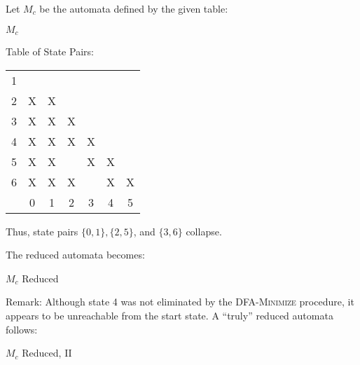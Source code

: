 Let $M_c$ be the automata defined by the given table:
\begin{automata}{$M_c$}
	
	
	
	
	
	
	
	
	
\end{automata}

Table of State Pairs: \\
\begin{center} \begin{tabular}{*{7}{c|}}
									\cline{1-2}
	1 &                       \\	\cline{1-3}
	2 & X & X                 \\	\cline{1-4}
	3 & X & X & X             \\	\cline{1-5}
	4 & X & X & X & X         \\	\cline{1-6}
	5 & X & X &   & X & X     \\	\hline
	6 & X & X & X &   & X & X \\	\hline
	  & 0 & 1 & 2 & 3 & 4 & 5 \\
\end{tabular} \end{center}

Thus, state pairs $\{0,1\}, \{2,5\}$, and $\{3,6\}$ collapse.

The reduced automata becomes:
\begin{automata}{$M_c$ Reduced}
	
	
	
	
	
\end{automata}

Remark: Although state 4 was not eliminated by the \textsc{DFA-Minimize} procedure, it appears to be unreachable from the start state. A ``truly'' reduced automata follows:

\begin{automata}{$M_c$ Reduced, II}
	
	
	
	
\end{automata}